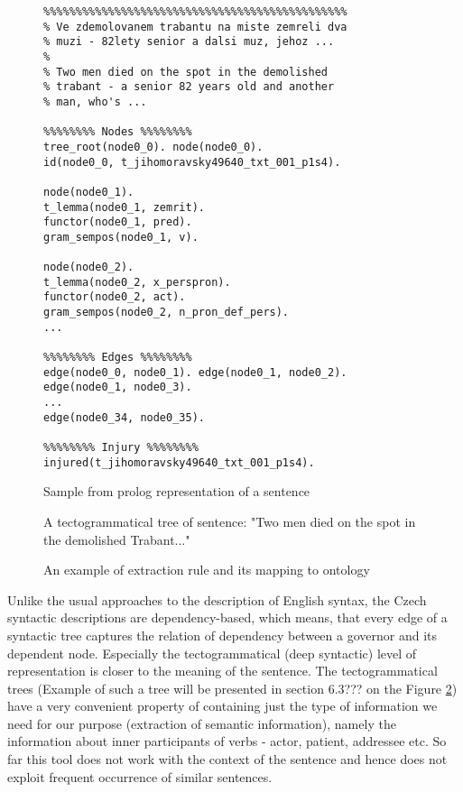 \documentclass{sig-alternate}
\begin{document}
\begin{figure}
{\footnotesize\begin{verbatim}
%%%%%%%%%%%%%%%%%%%%%%%%%%%%%%%%%%%%%%%%%%%%%%%
% Ve zdemolovanem trabantu na miste zemreli dva
% muzi - 82lety senior a dalsi muz, jehoz ...
%
% Two men died on the spot in the demolished 
% trabant - a senior 82 years old and another 
% man, who's ...

%%%%%%%% Nodes %%%%%%%%
tree_root(node0_0). node(node0_0). 
id(node0_0, t_jihomoravsky49640_txt_001_p1s4).

node(node0_1).
t_lemma(node0_1, zemrit).
functor(node0_1, pred).
gram_sempos(node0_1, v). 

node(node0_2).
t_lemma(node0_2, x_perspron).
functor(node0_2, act).
gram_sempos(node0_2, n_pron_def_pers).
...

%%%%%%%% Edges %%%%%%%%
edge(node0_0, node0_1). edge(node0_1, node0_2). edge(node0_1, node0_3). 
... 
edge(node0_34, node0_35).

%%%%%%%% Injury %%%%%%%%
injured(t_jihomoravsky49640_txt_001_p1s4).

\end{verbatim}}
\caption{Sample from prolog representation of a sentence }
\label{img:prologFacts}
\end{figure}


\begin{figure}
\centering
{}
\caption{A tectogrammatical tree of sentence: "Two men died on the spot in the demolished Trabant..."}
\label{img:tectogrammatical}
\end{figure}



\begin{figure}
\centering
{}
\caption{An example of extraction rule and its mapping to ontology}
\label{img:ExtractionOntology}
\end{figure}


Unlike the usual approaches to the description of English syntax, the Czech syntactic descriptions are dependency-based, which means, that every edge of a syntactic tree captures the relation of dependency between a governor and its dependent node. Especially the tectogrammatical (deep syntactic) level of representation \cite{biblio:MiBeAnnotationtectogrammatical2006} is closer to the meaning of the sentence. The tectogrammatical trees (Example of such a tree will be presented in section 6.3??? on the Figure \ref{img:tectogrammatical}) have a very convenient property of containing just the type of information we need for our purpose (extraction of semantic information), namely the information about inner participants of verbs - actor, patient, addressee etc. So far this tool does not work with the context of the sentence and hence does not exploit frequent occurrence of similar sentences.
\end{document}
